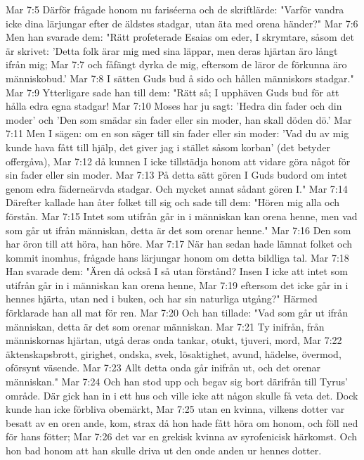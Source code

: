 Mar 7:5  Därför frågade honom nu fariséerna och de skriftlärde: "Varför vandra icke dina lärjungar efter de äldstes stadgar, utan äta med orena händer?"
Mar 7:6  Men han svarade dem: "Rätt profeterade Esaias om eder, I skrymtare, såsom det är skrivet: 'Detta folk ärar mig med sina läppar, men deras hjärtan äro långt ifrån mig;
Mar 7:7  och fåfängt dyrka de mig, eftersom de läror de förkunna äro människobud.'
Mar 7:8  I sätten Guds bud å sido och hållen människors stadgar."
Mar 7:9  Ytterligare sade han till dem: "Rätt så; I upphäven Guds bud för att hålla edra egna stadgar!
Mar 7:10  Moses har ju sagt: 'Hedra din fader och din moder' och 'Den som smädar sin fader eller sin moder, han skall döden dö.'
Mar 7:11  Men I sägen: om en son säger till sin fader eller sin moder: 'Vad du av mig kunde hava fått till hjälp, det giver jag i stället såsom korban' (det betyder offergåva),
Mar 7:12  då kunnen I icke tillstädja honom att vidare göra något för sin fader eller sin moder.
Mar 7:13  På detta sätt gören I Guds budord om intet genom edra fäderneärvda stadgar. Och mycket annat sådant gören I."
Mar 7:14  Därefter kallade han åter folket till sig och sade till dem: "Hören mig alla och förstån.
Mar 7:15  Intet som utifrån går in i människan kan orena henne, men vad som går ut ifrån människan, detta är det som orenar henne."
Mar 7:16  Den som har öron till att höra, han höre.
Mar 7:17  När han sedan hade lämnat folket och kommit inomhus, frågade hans lärjungar honom om detta bildliga tal.
Mar 7:18  Han svarade dem: "Ären då också I så utan förstånd? Insen I icke att intet som utifrån går in i människan kan orena henne,
Mar 7:19  eftersom det icke går in i hennes hjärta, utan ned i buken, och har sin naturliga utgång?" Härmed förklarade han all mat för ren.
Mar 7:20  Och han tillade: "Vad som går ut ifrån människan, detta är det som orenar människan.
Mar 7:21  Ty inifrån, från människornas hjärtan, utgå deras onda tankar, otukt, tjuveri, mord,
Mar 7:22  äktenskapsbrott, girighet, ondska, svek, lösaktighet, avund, hädelse, övermod, oförsynt väsende.
Mar 7:23  Allt detta onda går inifrån ut, och det orenar människan."
Mar 7:24  Och han stod upp och begav sig bort därifrån till Tyrus' område. Där gick han in i ett hus och ville icke att någon skulle få veta det. Dock kunde han icke förbliva obemärkt,
Mar 7:25  utan en kvinna, vilkens dotter var besatt av en oren ande, kom, strax då hon hade fått höra om honom, och föll ned för hans fötter;
Mar 7:26  det var en grekisk kvinna av syrofenicisk härkomst. Och hon bad honom att han skulle driva ut den onde anden ur hennes dotter.
